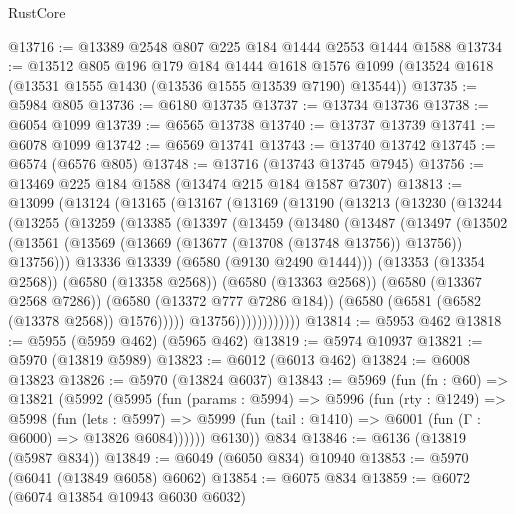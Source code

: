 \begin{lexlean}{RustCore}
\begin{coremodule}
@13716 := @13389 @2548 @807 @225 @184 @1444 @2553 @1444 @1588
@13734 := @13512
    @805
    @196
    @179
    @184
    @1444
    @1618
    @1576
    @1099
    (@13524 @1618 (@13531 @1555 @1430 (@13536 @1555 @13539 @7190) @13544))
@13735 := @5984 @805
@13736 := @6180 @13735
@13737 := @13734 @13736
@13738 := @6054 @1099
@13739 := @6565 @13738
@13740 := @13737 @13739
@13741 := @6078 @1099
@13742 := @6569 @13741
@13743 := @13740 @13742
@13745 := @6574 (@6576 @805)
@13748 := @13716 (@13743 @13745 @7945)
@13756 := @13469 @225 @184 @1588 (@13474 @215 @184 @1587 @7307)
@13813 := @13099
    (@13124
      (@13165
        (@13167
          (@13169
            (@13190
              (@13213
                (@13230
                  (@13244
                    (@13255
                      (@13259
                        (@13385
                          (@13397
                            (@13459
                              (@13480
                                (@13487
                                  (@13497
                                    (@13502
                                      (@13561
                                        (@13569
                                          (@13669 (@13677 (@13708 (@13748 @13756)) @13756))
                                          @13756)))
                                    @13336
                                    @13339
                                    (@6580 (@9130 @2490 @1444)))
                                  (@13353 (@13354 @2568))
                                  (@6580 (@13358 @2568))
                                  (@6580 (@13363 @2568))
                                  (@6580 (@13367 @2568 @7286))
                                  (@6580 (@13372 @777 @7286 @184))
                                  (@6580 (@6581 (@6582 (@13378 @2568)) @1576)))))
                            @13756))))))))))))
@13814 := @5953 @462
@13818 := @5955 (@5959 @462) (@5965 @462)
@13819 := @5974 @10937
@13821 := @5970 (@13819 @5989)
@13823 := @6012 (@6013 @462)
@13824 := @6008 @13823
@13826 := @5970 (@13824 @6037)
@13843 := @5969
    (fun (fn : @60) =>
    @13821
      (@5992
        (@5995
          (fun (params : @5994) =>
          @5996
            (fun (rty : @1249) =>
            @5998
              (fun (lets : @5997) =>
              @5999 (fun (tail : @1410) => @6001 (fun (Γ : @6000) => @13826 @6084))))))
        @6130))
    @834
@13846 := @6136 (@13819 (@5987 @834))
@13849 := @6049 (@6050 @834) @10940
@13853 := @5970 (@6041 (@13849 @6058) @6062)
@13854 := @6075 @834
@13859 := @6072 (@6074 @13854 @10943 @6030 @6032)

\end{coremodule}
\end{lexlean}
